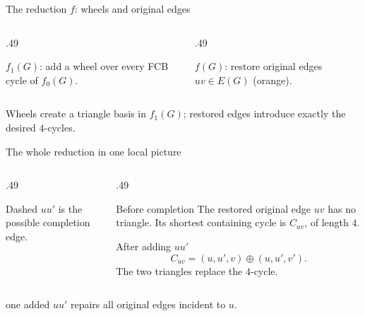 \begin{frame}{The reduction \(f\): wheels and original edges}
 \begin{columns}[T,onlytextwidth]
  \begin{column}{.49\textwidth}
   \begin{center}\end{center}
   \centering\small \(f_1(G)\): add a wheel over every FCB cycle of \(f_0(G)\).
  \end{column}
  \begin{column}{.49\textwidth}
   \begin{center}\end{center}
   \centering\small \(f(G)\): restore original edges \(uv\in E(G)\) (orange).
  \end{column}
 \end{columns}
 \vspace{.08cm}
  Wheels create a triangle basis in \(f_1(G)\); restored edges introduce exactly the desired \(4\)-cycles.
\end{frame}


\begin{frame}{The whole reduction in one local picture}
 \begin{columns}[c,onlytextwidth]
  \begin{column}{.49\textwidth}
   \centering\resizebox{.81\linewidth}{!}{\FourCycleGadget}
   \par\scriptsize Dashed $uu'$ is the possible completion edge.
  \end{column}
  \begin{column}{.49\textwidth}
   \begin{block}{Before completion}
    The restored original edge $uv$ has no triangle. Its shortest containing cycle is $C_{uv}$, of length $4$.
   \end{block}
   \begin{block}{After adding $uu'$}
    \[ C_{uv}=(u,u',v)\oplus(u,u',v'). \]
    The two triangles replace the $4$-cycle.
   \end{block}
  \end{column}
 \end{columns}
 \small{} one added $uu'$ repairs all original edges incident to $u$.
\end{frame}


